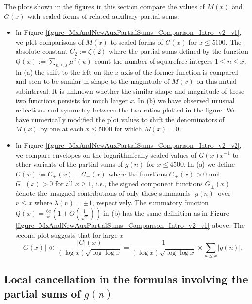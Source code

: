 \documentclass[11pt,reqno,a4letter]{article}
\newcommand{\hlocalref}[1]{\hyperref[#1]{\ref{#1}}}
\numberwithin{equation}{section}
\numberwithin{figure}{section}
\numberwithin{table}{section}
\theoremstyle{plain}
\numberwithin{theorem}{section}
\theoremstyle{definition}
\begin{document}
The plots shown in the figures in this section compare 
the values of $M(x)$ and $G(x)$ with scaled forms of related auxiliary partial sums: 
\begin{itemize}[noitemsep,topsep=0pt,leftmargin=0.23in]

\item In Figure \hlocalref{figure_MxAndNewAuxPartialSums_Comparison_Intro_v2_v1}, 
      we plot comparisons of $M(x)$ to scaled forms of $G(x)$ for $x \leq 5000$. The 
      absolute constant $C_2 := \zeta(2)$ where the partial sums defined by the function 
      $Q(x) := \sum_{n \leq x} \mu^2(n)$ count the number of squarefree integers $1 \leq n \leq x$. 
      In (a) the shift to the left on the $x$-axis of the former function 
      is compared and seen to be similar in shape to the magnitude of $M(x)$ on this initial subinterval. 
      It is unknown whether the similar shape and magnitude of these two functions persists for 
      much larger $x$. 
      In (b) we have observed unusual reflections and symmetry between the two ratios plotted in the 
      figure. We have numerically modified the plot values to shift the denominators of 
      $M(x)$ by one at each $x \leq 5000$ for which $M(x) = 0$. 

\item In Figure \hlocalref{figure_MxAndNewAuxPartialSums_Comparison_Intro_v2_v2}, we compare 
      envelopes on the logarithmically scaled values of $G(x) x^{-1}$ to other variants of 
      the partial sums of $g(n)$ for $x \leq 4500$. 
      In (a) we define $G(x) := G_{+}(x) - G_{-}(x)$ where the functions 
      $G_{+}(x) > 0$ and $G_{-}(x) > 0$ for all $x \geq 1$, 
      i.e., the signed component functions $G_{\pm}(x)$ 
      denote the unsigned contributions of only those summands 
      $|g(n)|$ over $n \leq x$ where $\lambda(n) = \pm 1$, respectively. 
      The summatory function $Q(x) = \frac{6x}{\pi^2}\left(1+O\left(\frac{1}{\sqrt{x}}\right)\right)$ 
      in (b) has the same definition as in 
      Figure \hlocalref{figure_MxAndNewAuxPartialSums_Comparison_Intro_v2_v1} above. 
      The second plot suggests that for large $x$ 
      \[
      |G(x)| \ll \frac{|G|(x)}{(\log x) \sqrt{\log\log x}} = 
           \frac{1}{(\log x) \sqrt{\log\log x}} \times \sum_{n \leq x} |g(n)|.
      \]

\end{itemize}

\subsection{Local cancellation in 
	    the formulas involving the partial sums of $g(n)$} 
\label{subSection_LocalCancellationOfGInvx} 
\end{document}
